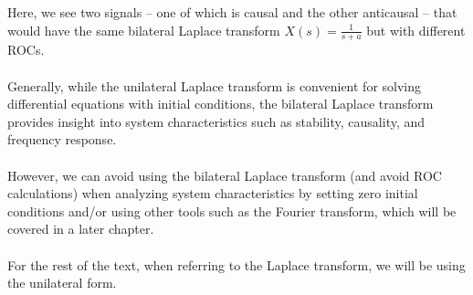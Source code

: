 \documentclass{report}
\begin{document}
Here, we see two signals -- one of which is causal and the other anticausal -- that would have the same bilateral Laplace transform $X(s)=\frac{1}{s+a}$ but with 
different ROCs.
\\ \\
Generally, while the unilateral Laplace transform is convenient for solving differential equations with initial conditions, the bilateral Laplace transform provides insight into system characteristics 
such as stability, causality, and frequency response. 
\\ \\ 
However, we can avoid using the bilateral Laplace transform (and avoid ROC calculations) when analyzing system characteristics by setting zero initial conditions and/or using other 
tools such as the Fourier transform, which will be covered in a later chapter. 
\\ \\
For the rest of the text, when referring to the Laplace transform, we will be using the unilateral form.
\end{document}
